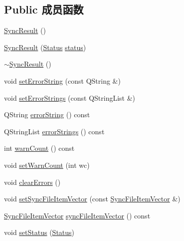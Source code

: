 \subsection*{Public 成员函数}
\begin{DoxyCompactItemize}
\item 
\hyperlink{class_o_c_c_1_1_sync_result_adadd6baa40469cd43c92691658b7f8aa}{Sync\+Result} ()
\item 
\hyperlink{class_o_c_c_1_1_sync_result_a839d8f6963c95bc21eae683f87543ed7}{Sync\+Result} (\hyperlink{class_o_c_c_1_1_sync_result_a4f4487ea8c462f2ec90c43bce6df1d1e}{Status} \hyperlink{class_o_c_c_1_1_sync_result_af185f866510a51a15f90f9c765cfb914}{status})
\item 
\hyperlink{class_o_c_c_1_1_sync_result_a9bb16c4f7d447d3a77b7e6711dc25f4d}{$\sim$\+Sync\+Result} ()
\item 
void \hyperlink{class_o_c_c_1_1_sync_result_afe0a86f4f4a4f96e396d379f244e5088}{set\+Error\+String} (const Q\+String \&)
\item 
void \hyperlink{class_o_c_c_1_1_sync_result_aad94fb29ac3628b8d1f14e47ed7690ae}{set\+Error\+Strings} (const Q\+String\+List \&)
\item 
Q\+String \hyperlink{class_o_c_c_1_1_sync_result_af577eeccf50c64f2fa86ffe75f177c1e}{error\+String} () const
\item 
Q\+String\+List \hyperlink{class_o_c_c_1_1_sync_result_ab262a64e66abbbce8a9b267d593b9b01}{error\+Strings} () const
\item 
int \hyperlink{class_o_c_c_1_1_sync_result_af93b3d0c9ed0a6411e12c6d5bb070618}{warn\+Count} () const
\item 
void \hyperlink{class_o_c_c_1_1_sync_result_ac6fbb22a038fbd65467e1415e879c33b}{set\+Warn\+Count} (int wc)
\item 
void \hyperlink{class_o_c_c_1_1_sync_result_a05cf060d003232f0ea6b73c6ab9d95b2}{clear\+Errors} ()
\item 
void \hyperlink{class_o_c_c_1_1_sync_result_a0e41696ab534cd4fb0f7adbfbcd65b82}{set\+Sync\+File\+Item\+Vector} (const \hyperlink{namespace_o_c_c_af407f0fdf0476e0bfce478be3d0e441e}{Sync\+File\+Item\+Vector} \&)
\item 
\hyperlink{namespace_o_c_c_af407f0fdf0476e0bfce478be3d0e441e}{Sync\+File\+Item\+Vector} \hyperlink{class_o_c_c_1_1_sync_result_a5dd6a09aa41ef38cbfcfb0e18e319408}{sync\+File\+Item\+Vector} () const
\item 
void \hyperlink{class_o_c_c_1_1_sync_result_a86da20d2138f05d966c916f7a2731399}{set\+Status} (\hyperlink{class_o_c_c_1_1_sync_result_a4f4487ea8c462f2ec90c43bce6df1d1e}{Status})

\end{DoxyCompactItemize}
